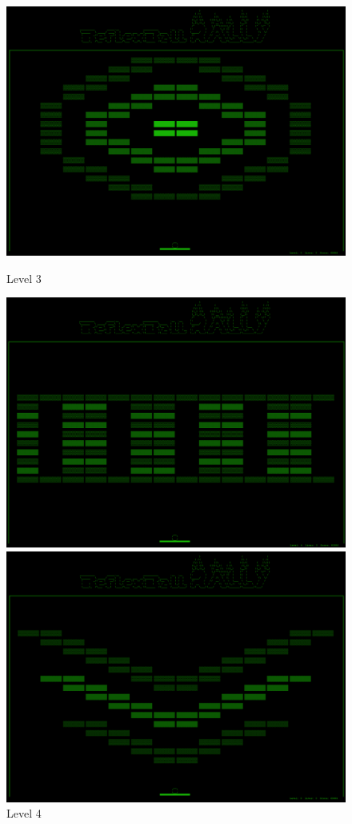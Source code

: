 \begin{figure}[H]
\begin{minipage}[b]{0.32\textwidth}
\includegraphics[width=\linewidth]{figs/screenshots/level3.png}
\caption{Level 3}
\label{fig:level3}
\end{minipage}\hfill
\begin{minipage}[b]{0.32\textwidth}
\includegraphics[width=\linewidth]{figs/screenshots/level4.png}
\caption{Level 4}
\label{fig:level4}
\end{minipage}\hfill
\begin{minipage}[b]{0.32\textwidth}
\includegraphics[width=\linewidth]{figs/screenshots/level5.png}

\end{minipage}
\end{figure}
